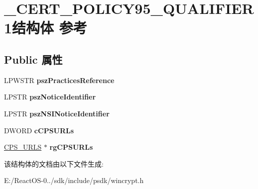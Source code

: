 \hypertarget{struct___c_e_r_t___p_o_l_i_c_y95___q_u_a_l_i_f_i_e_r1}{}\section{\+\_\+\+C\+E\+R\+T\+\_\+\+P\+O\+L\+I\+C\+Y95\+\_\+\+Q\+U\+A\+L\+I\+F\+I\+E\+R1结构体 参考}
\label{struct___c_e_r_t___p_o_l_i_c_y95___q_u_a_l_i_f_i_e_r1}
\subsection*{Public 属性}
\begin{DoxyCompactItemize}
\item 
\mbox{\label{struct___c_e_r_t___p_o_l_i_c_y95___q_u_a_l_i_f_i_e_r1_a37e15843f942af26ddcfe505d1415ef1}} 
L\+P\+W\+S\+TR {\bfseries psz\+Practices\+Reference}
\item 
\mbox{\label{struct___c_e_r_t___p_o_l_i_c_y95___q_u_a_l_i_f_i_e_r1_a46c4082f03b524ea2ceff3f6c5fc1f15}} 
L\+P\+S\+TR {\bfseries psz\+Notice\+Identifier}
\item 
\mbox{\label{struct___c_e_r_t___p_o_l_i_c_y95___q_u_a_l_i_f_i_e_r1_a71ac7b16fd13ea44455b53b31c2b0f85}} 
L\+P\+S\+TR {\bfseries psz\+N\+S\+I\+Notice\+Identifier}
\item 
\mbox{\label{struct___c_e_r_t___p_o_l_i_c_y95___q_u_a_l_i_f_i_e_r1_a67ce8593b30f68a3f174a45f504f225e}} 
D\+W\+O\+RD {\bfseries c\+C\+P\+S\+U\+R\+Ls}
\item 
\mbox{\label{struct___c_e_r_t___p_o_l_i_c_y95___q_u_a_l_i_f_i_e_r1_afa3ff6d7a7ff816f3886e2ff6dfcf65f}} 
\hyperlink{struct___c_p_s___u_r_l_s}{C\+P\+S\+\_\+\+U\+R\+LS} $\ast$ {\bfseries rg\+C\+P\+S\+U\+R\+Ls}
\end{DoxyCompactItemize}


该结构体的文档由以下文件生成\+:\begin{DoxyCompactItemize}
\item 
E\+:/\+React\+O\+S-\/0../sdk/include/psdk/wincrypt.\+h\end{DoxyCompactItemize}
